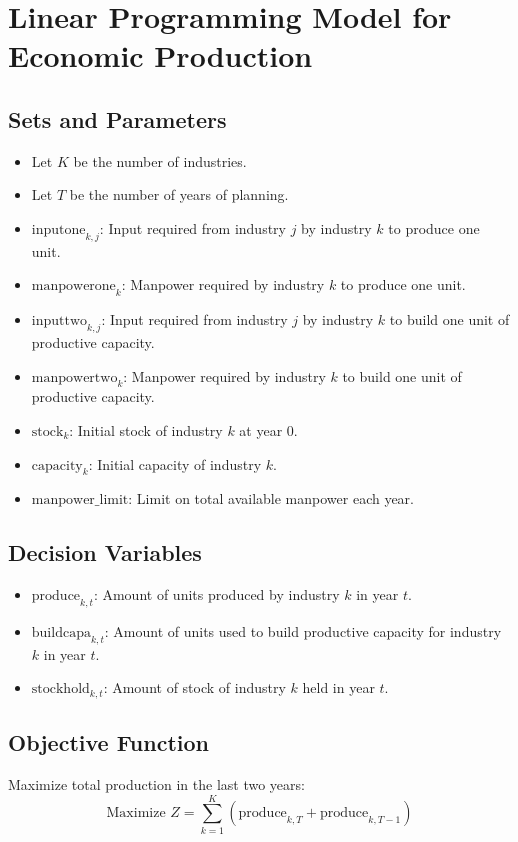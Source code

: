 \documentclass{article}
\begin{document}
\section*{Linear Programming Model for Economic Production}

\subsection*{Sets and Parameters}
\begin{itemize}
    \item Let \( K \) be the number of industries.
    \item Let \( T \) be the number of years of planning.
    \item \( \text{inputone}_{k, j} \): Input required from industry \( j \) by industry \( k \) to produce one unit.
    \item \( \text{manpowerone}_{k} \): Manpower required by industry \( k \) to produce one unit.
    \item \( \text{inputtwo}_{k, j} \): Input required from industry \( j \) by industry \( k \) to build one unit of productive capacity.
    \item \( \text{manpowertwo}_{k} \): Manpower required by industry \( k \) to build one unit of productive capacity.
    \item \( \text{stock}_{k} \): Initial stock of industry \( k \) at year 0.
    \item \( \text{capacity}_{k} \): Initial capacity of industry \( k \).
    \item \( \text{manpower\_limit} \): Limit on total available manpower each year.
\end{itemize}

\subsection*{Decision Variables}
\begin{itemize}
    \item \( \text{produce}_{k, t} \): Amount of units produced by industry \( k \) in year \( t \).
    \item \( \text{buildcapa}_{k, t} \): Amount of units used to build productive capacity for industry \( k \) in year \( t \).
    \item \( \text{stockhold}_{k, t} \): Amount of stock of industry \( k \) held in year \( t \).
\end{itemize}

\subsection*{Objective Function}
Maximize total production in the last two years:
\[
\text{Maximize } Z = \sum_{k=1}^{K} \left( \text{produce}_{k, T} + \text{produce}_{k, T-1} \right)
\]
\end{document}
